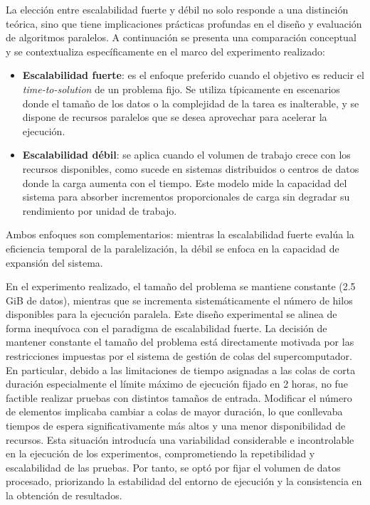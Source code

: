             La elección entre escalabilidad fuerte y débil no solo responde a una distinción teórica, sino que tiene implicaciones prácticas profundas en el diseño y evaluación de algoritmos paralelos. A continuación se presenta una comparación conceptual y se contextualiza específicamente en el marco del experimento realizado:
                    
            \begin{itemize}
            
                \item \textbf{Escalabilidad fuerte}: es el enfoque preferido cuando el objetivo es reducir el \textit{time-to-solution} de un problema fijo. Se utiliza típicamente en escenarios donde el tamaño de los datos o la complejidad de la tarea es inalterable, y se dispone de recursos paralelos que se desea aprovechar para acelerar la ejecución.
                
                \item \textbf{Escalabilidad débil}: se aplica cuando el volumen de trabajo crece con los recursos disponibles, como sucede en sistemas distribuidos o centros de datos donde la carga aumenta con el tiempo. Este modelo mide la capacidad del sistema para absorber incrementos proporcionales de carga sin degradar su rendimiento por unidad de trabajo.

            \end{itemize}
            
            Ambos enfoques son complementarios: mientras la escalabilidad fuerte evalúa la eficiencia temporal de la paralelización, la débil se enfoca en la capacidad de expansión del sistema.
                    
            En el experimento realizado, el tamaño del problema se mantiene constante (2.5 GiB de datos), mientras que se incrementa sistemáticamente el número de hilos disponibles para la ejecución paralela. Este diseño experimental se alinea de forma inequívoca con el paradigma de escalabilidad fuerte. La decisión de mantener constante el tamaño del problema está directamente motivada por las restricciones impuestas por el sistema de gestión de colas del supercomputador. En particular, debido a las limitaciones de tiempo asignadas a las colas de corta duración especialmente el límite máximo de ejecución fijado en 2 horas, no fue factible realizar pruebas con distintos tamaños de entrada. Modificar el número de elementos implicaba cambiar a colas de mayor duración, lo que conllevaba tiempos de espera significativamente más altos y una menor disponibilidad de recursos. Esta situación introducía una variabilidad considerable e incontrolable en la ejecución de los experimentos, comprometiendo la repetibilidad y escalabilidad de las pruebas. Por tanto, se optó por fijar el volumen de datos procesado, priorizando la estabilidad del entorno de ejecución y la consistencia en la obtención de resultados.
            
